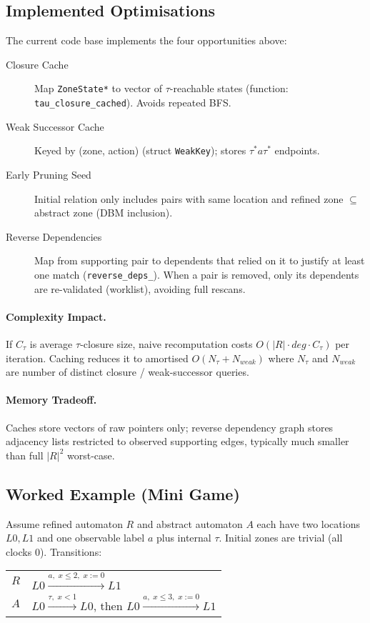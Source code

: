 \subsection{Implemented Optimisations}
The current code base implements the four opportunities above:
\begin{description}
  \item[Closure Cache] Map \texttt{ZoneState*} to vector of $\tau$-reachable states (function: \texttt{tau\_closure\_cached}). Avoids repeated BFS.
  \item[Weak Successor Cache] Keyed by (zone, action) (struct \texttt{WeakKey}); stores $\tau^* a \tau^*$ endpoints.
  \item[Early Pruning Seed] Initial relation only includes pairs with same location and refined zone $\subseteq$ abstract zone (DBM inclusion).
  \item[Reverse Dependencies] Map from supporting pair to dependents that relied on it to justify at least one match (\texttt{reverse\_deps\_}). When a pair is removed, only its dependents are re-validated (worklist), avoiding full rescans.
\end{description}

\paragraph{Complexity Impact.} If $C_\tau$ is average $\tau$-closure size, naive recomputation costs $O(|R|\cdot deg \cdot C_\tau)$ per iteration. Caching reduces it to amortised $O(N_\tau + N_{weak})$ where $N_\tau$ and $N_{weak}$ are number of distinct closure / weak-successor queries.

\paragraph{Memory Tradeoff.} Caches store vectors of raw pointers only; reverse dependency graph stores adjacency lists restricted to observed supporting edges, typically much smaller than full $|R|^2$ worst-case.

\subsection{Worked Example (Mini Game)}
Assume refined automaton $R$ and abstract automaton $A$ each have two locations $L0, L1$ and one observable label $a$ plus internal $\tau$. Initial zones are trivial (all clocks 0). Transitions:
\begin{center}
\begin{tabular}{l|l}
$R$ & $L0 \xrightarrow{a,\; x\le 2,\; x:=0} L1$ \\
$A$ & $L0 \xrightarrow{\tau,\; x<1} L0$, then $L0 \xrightarrow{a,\; x\le 3,\; x:=0} L1$ \\
\end{tabular}
\end{center}

